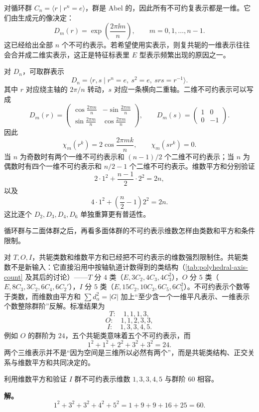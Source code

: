 对循环群 $C_n=\langle r\mid r^n=e\rangle$，群是 Abel 的，因此所有不可约复表示都是一维。它们由生成元的像决定：
\[
D_m(r)=\exp\!\left(\frac{2\pi\ii m}{n}\right),
\qquad m=0,1,\dots,n-1.
\label{eq:cn-irreps}
\]
这已经给出全部 $n$ 个不可约表示。若希望使用实表示，则复共轭的一维表示往往会合并成二维实表示，这正是特征标表里 $E$ 型表示频繁出现的原因之一。

对 $D_n$，可取群表示
\[
D_n=\langle r,s\mid r^n=e,\ s^2=e,\ srs=r^{-1}\rangle.
\]
其中 $r$ 对应绕主轴的 $2\pi/n$ 转动，$s$ 对应一条横向二重轴。二维不可约表示可以写成
\[
D_m(r)=
\begin{pmatrix}
\cos\frac{2\pi m}{n}&-\sin\frac{2\pi m}{n}\\
\sin\frac{2\pi m}{n}&\cos\frac{2\pi m}{n}
\end{pmatrix},
\qquad
D_m(s)=
\begin{pmatrix}1&0\\0&-1\end{pmatrix}.
\]
因此
\[
\chi_m(r^k)=2\cos\frac{2\pi mk}{n},
\qquad
\chi_m(sr^k)=0.
\]
当 $n$ 为奇数时有两个一维不可约表示和 $(n-1)/2$ 个二维不可约表示；当 $n$ 为偶数时有四个一维不可约表示和 $n/2-1$ 个二维不可约表示。维数平方和分别验证
\[
2\cdot1^2+\frac{n-1}{2}\cdot2^2=2n,
\]
以及
\[
4\cdot1^2+\left(\frac n2-1\right)2^2=2n.
\]
这比逐个 $D_2,D_3,D_4,D_6$ 单独重算更有普适性。

循环群与二面体群之后，再看多面体群的不可约表示维数怎样由类数和平方和条件限制。

对 $T,O,I$，共轭类数和维数平方和已经把不可约表示的维数强烈限制住。共轭类数不是新输入：它直接沿用中按轴轨道计数得到的类结构（\cref{tab:polyhedral-axis-count} 及其后的讨论）——$T$ 分 $4$ 类（$E,3C_2,4C_3,4C_3^2$），$O$ 分 $5$ 类（$E,8C_3,3C_2,6C_4,6C_2'$），$I$ 分 $5$ 类（$E,15C_2,10C_3,6C_5,6C_5^2$）。不可约表示个数等于类数，而维数由平方和 $\sum d_\alpha^2=|G|$ 加上“至少含一个一维平凡表示、一维表示个数整除群阶”反解。标准结果为
\[
T:\quad 1,1,1,3,
\]
\[
O:\quad 1,1,2,3,3,
\]
\[
I:\quad 1,3,3,4,5.
\]
例如 $O$ 的群阶为 $24$，五个共轭类意味着五个不可约表示，而
\[
1^2+1^2+2^2+3^2+3^2=24.
\]
两个三维表示并不是“因为空间是三维所以必然有两个”，而是共轭类结构、正交关系与维数平方和共同决定的。

\begin{workedexample}
利用维数平方和验证 $I$ 群不可约表示维数 $1,3,3,4,5$ 与群阶 $60$ 相容。

\textbf{解。}
\[
1^2+3^2+3^2+4^2+5^2=1+9+9+16+25=60.
\]
\end{workedexample}


